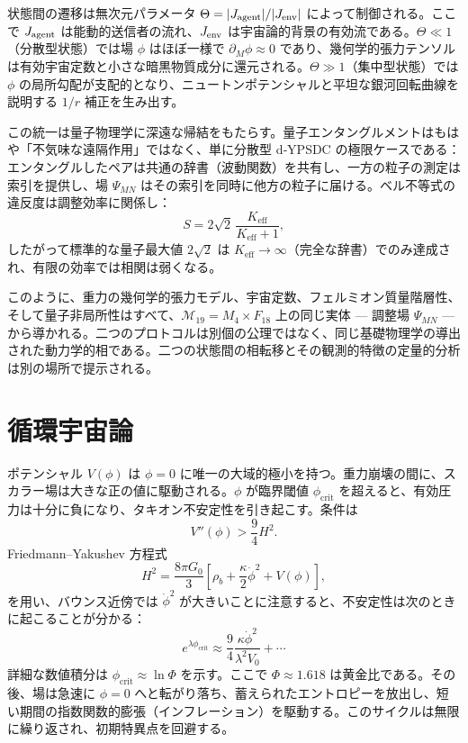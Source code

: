 \documentclass[12pt,a4paper]{article}
\begin{document}
	状態間の遷移は無次元パラメータ \(\Theta = |J_{\rm agent}| / |J_{\rm env}|\) によって制御される。ここで \(J_{\rm agent}\) は能動的送信者の流れ、\(J_{\rm env}\) は宇宙論的背景の有効流である。\(\Theta\ll1\)（分散型状態）では場 \(\phi\) はほぼ一様で \(\partial_M\phi\approx0\) であり、幾何学的張力テンソルは有効宇宙定数と小さな暗黒物質成分に還元される。\(\Theta\gg1\)（集中型状態）では \(\phi\) の局所勾配が支配的となり、ニュートンポテンシャルと平坦な銀河回転曲線を説明する \(1/r\) 補正を生み出す。
	
	この統一は量子物理学に深遠な帰結をもたらす。量子エンタングルメントはもはや「不気味な遠隔作用」ではなく、単に分散型 d‑YPSDC の極限ケースである：エンタングルしたペアは共通の辞書（波動関数）を共有し、一方の粒子の測定は索引を提供し、場 \(\Psi_{MN}\) はその索引を同時に他方の粒子に届ける。ベル不等式の違反度は調整効率に関係し：
	\begin{equation}
		S = 2\sqrt{2}\,\frac{K_{\mathrm{eff}}}{K_{\mathrm{eff}}+1},
		\label{eq:bell-eff}
	\end{equation}
	したがって標準的な量子最大値 \(2\sqrt{2}\) は \(K_{\mathrm{eff}}\to\infty\)（完全な辞書）でのみ達成され、有限の効率では相関は弱くなる。
	
	このように、重力の幾何学的張力モデル、宇宙定数、フェルミオン質量階層性、そして量子非局所性はすべて、\(\mathcal{M}_{19}=M_4\times F_{18}\) 上の同じ実体 — 調整場 \(\Psi_{MN}\) — から導かれる。二つのプロトコルは別個の公理ではなく、同じ基礎物理学の導出された動力学的相である。二つの状態間の相転移とその観測的特徴の定量的分析は別の場所で提示される。
	
	\section{循環宇宙論}
	
	ポテンシャル \(V(\phi)\) は \(\phi=0\) に唯一の大域的極小を持つ。重力崩壊の間に、スカラー場は大きな正の値に駆動される。\(\phi\) が臨界閾値 \(\phi_{\mathrm{crit}}\) を超えると、有効圧力は十分に負になり、タキオン不安定性を引き起こす。条件は
	\[
	V''(\phi) > \frac{9}{4} H^2.
	\]
	Friedmann–Yakushev 方程式
	\[
	H^2 = \frac{8\pi G_0}{3} \left[ \rho_b + \frac{\kappa}{2}\dot\phi^2 + V(\phi) \right],
	\]
	を用い、バウンス近傍では \(\dot\phi^2\) が大きいことに注意すると、不安定性は次のときに起こることが分かる：
	\[
	e^{\lambda\phi_{\mathrm{crit}}} \approx \frac{9}{4} \frac{\kappa\dot\phi^2}{\lambda^2 V_0} + \cdots
	\]
	詳細な数値積分は \(\phi_{\mathrm{crit}} \approx \ln\Phi\) を示す。ここで \(\Phi \approx 1.618\) は黄金比である。その後、場は急速に \(\phi=0\) へと転がり落ち、蓄えられたエントロピーを放出し、短い期間の指数関数的膨張（インフレーション）を駆動する。このサイクルは無限に繰り返され、初期特異点を回避する。
	
\end{document}

